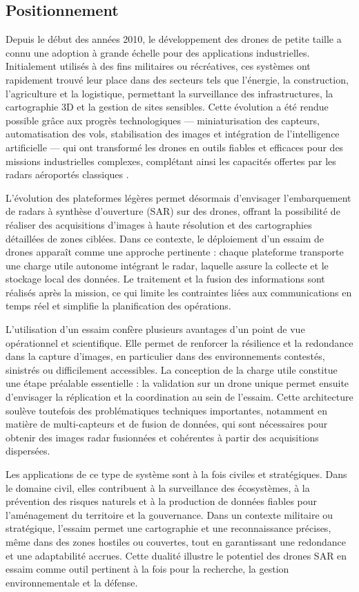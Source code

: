 \subsection{Positionnement}

Depuis le début des années 2010, le développement des drones de petite taille a connu une adoption à grande échelle pour des applications industrielles. Initialement utilisés à des fins militaires ou récréatives, ces systèmes ont rapidement trouvé leur place dans des secteurs tels que l’énergie, la construction, l’agriculture et la logistique, permettant la surveillance des infrastructures, la cartographie 3D et la gestion de sites sensibles. Cette évolution a été rendue possible grâce aux progrès technologiques — miniaturisation des capteurs, automatisation des vols, stabilisation des images et intégration de l’intelligence artificielle — qui ont transformé les drones en outils fiables et efficaces pour des missions industrielles complexes, complétant ainsi les capacités offertes par les radars aéroportés classiques \cite{wikipedia_drone,wikipedia_dji_matrice,foxtech_drone}.

L’évolution des plateformes légères permet désormais d’envisager l’embarquement de radars à synthèse d’ouverture (SAR) sur des drones, offrant la possibilité de réaliser des acquisitions d’images à haute résolution et des cartographies détaillées de zones ciblées. Dans ce contexte, le déploiement d’un essaim de drones apparaît comme une approche pertinente : chaque plateforme transporte une charge utile autonome intégrant le radar, laquelle assure la collecte et le stockage local des données. Le traitement et la fusion des informations sont réalisés après la mission, ce qui limite les contraintes liées aux communications en temps réel et simplifie la planification des opérations.

L’utilisation d’un essaim confère plusieurs avantages d’un point de vue opérationnel et scientifique. Elle permet de renforcer la résilience et la redondance dans la capture d’images, en particulier dans des environnements contestés, sinistrés ou difficilement accessibles. La conception de la charge utile constitue une étape préalable essentielle : la validation sur un drone unique permet ensuite d’envisager la réplication et la coordination au sein de l’essaim. Cette architecture soulève toutefois des problématiques techniques importantes, notamment en matière de multi-capteurs et de fusion de données, qui sont nécessaires pour obtenir des images radar fusionnées et cohérentes à partir des acquisitions dispersées.

Les applications de ce type de système sont à la fois civiles et stratégiques. Dans le domaine civil, elles contribuent à la surveillance des écosystèmes, à la prévention des risques naturels et à la production de données fiables pour l’aménagement du territoire et la gouvernance. Dans un contexte militaire ou stratégique, l’essaim permet une cartographie et une reconnaissance précises, même dans des zones hostiles ou couvertes, tout en garantissant une redondance et une adaptabilité accrues. Cette dualité illustre le potentiel des drones SAR en essaim comme outil pertinent à la fois pour la recherche, la gestion environnementale et la défense.